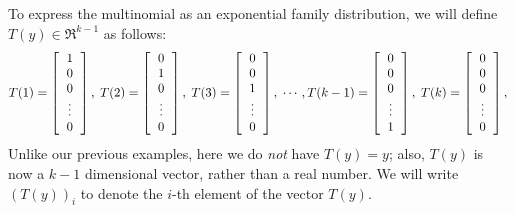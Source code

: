 \documentclass{article}
\begin{document}

To express the multinomial as an exponential family distribution, we will define
$T(y) \in \Re^{k-1}$ as follows:
{\footnotesize
\[
T(1) = \left[ \begin{tabular}{c} 1 \\ 0 \\ 0 \\ \vdots \\ 0 \end{tabular}\right], \;
T(2) = \left[ \begin{tabular}{c} 0 \\ 1 \\ 0 \\ \vdots \\ 0 \end{tabular}\right], \;
T(3) = \left[ \begin{tabular}{c} 0 \\ 0 \\ 1 \\ \vdots \\ 0 \end{tabular}\right], \;
\cdots,
T(k-1) = \left[ \begin{tabular}{c} 0 \\ 0 \\ 0 \\ \vdots \\ 1 \end{tabular}\right], \;
T(k) = \left[ \begin{tabular}{c} 0 \\ 0 \\ 0 \\ \vdots \\ 0 \end{tabular}\right], \;
\]
}%
Unlike our previous examples, here we do \emph{not} have $T(y) = y$; also,
$T(y)$ is now a $k-1$ dimensional vector, rather than a real number.
We will write $(T(y))_i$ to denote the $i$-th element of the vector $T(y)$.

\end{document}
